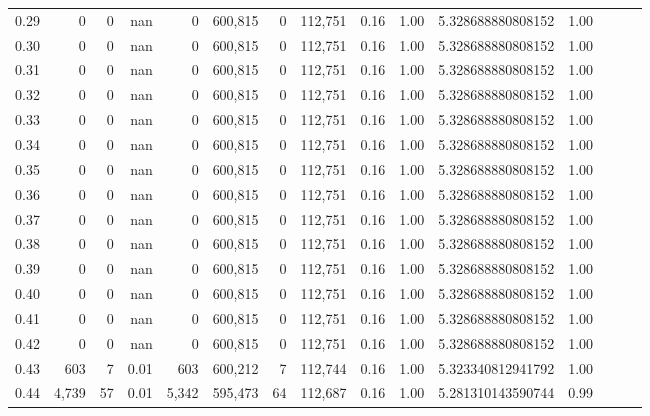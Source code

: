 \begin{tabular}{rrrrrrrrrrrrrrr}
0.29 &        0 &       0 &   nan &        0 &  600,815 &        0 &  112,751 &  0.16 &  1.00 &     5.328688880808152 &      1.00 \\
0.30 &        0 &       0 &   nan &        0 &  600,815 &        0 &  112,751 &  0.16 &  1.00 &     5.328688880808152 &      1.00 \\
0.31 &        0 &       0 &   nan &        0 &  600,815 &        0 &  112,751 &  0.16 &  1.00 &     5.328688880808152 &      1.00 \\
0.32 &        0 &       0 &   nan &        0 &  600,815 &        0 &  112,751 &  0.16 &  1.00 &     5.328688880808152 &      1.00 \\
0.33 &        0 &       0 &   nan &        0 &  600,815 &        0 &  112,751 &  0.16 &  1.00 &     5.328688880808152 &      1.00 \\
0.34 &        0 &       0 &   nan &        0 &  600,815 &        0 &  112,751 &  0.16 &  1.00 &     5.328688880808152 &      1.00 \\
0.35 &        0 &       0 &   nan &        0 &  600,815 &        0 &  112,751 &  0.16 &  1.00 &     5.328688880808152 &      1.00 \\
0.36 &        0 &       0 &   nan &        0 &  600,815 &        0 &  112,751 &  0.16 &  1.00 &     5.328688880808152 &      1.00 \\
0.37 &        0 &       0 &   nan &        0 &  600,815 &        0 &  112,751 &  0.16 &  1.00 &     5.328688880808152 &      1.00 \\
0.38 &        0 &       0 &   nan &        0 &  600,815 &        0 &  112,751 &  0.16 &  1.00 &     5.328688880808152 &      1.00 \\
0.39 &        0 &       0 &   nan &        0 &  600,815 &        0 &  112,751 &  0.16 &  1.00 &     5.328688880808152 &      1.00 \\
0.40 &        0 &       0 &   nan &        0 &  600,815 &        0 &  112,751 &  0.16 &  1.00 &     5.328688880808152 &      1.00 \\
0.41 &        0 &       0 &   nan &        0 &  600,815 &        0 &  112,751 &  0.16 &  1.00 &     5.328688880808152 &      1.00 \\
0.42 &        0 &       0 &   nan &        0 &  600,815 &        0 &  112,751 &  0.16 &  1.00 &     5.328688880808152 &      1.00 \\
0.43 &      603 &       7 &  0.01 &      603 &  600,212 &        7 &  112,744 &  0.16 &  1.00 &     5.323340812941792 &      1.00 \\
0.44 &    4,739 &      57 &  0.01 &    5,342 &  595,473 &       64 &  112,687 &  0.16 &  1.00 &     5.281310143590744 &      0.99 \\

\end{tabular}
